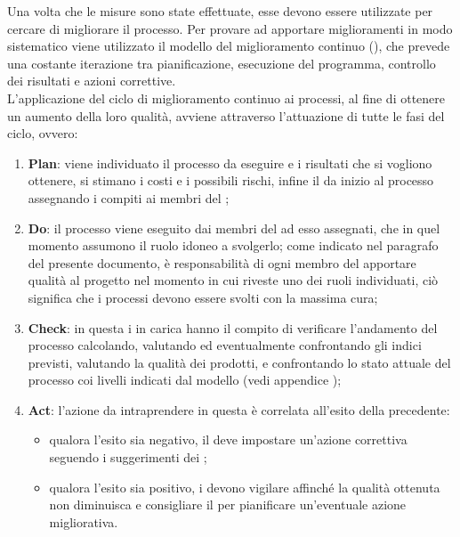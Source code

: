 		Una volta che le misure sono state effettuate, esse devono essere utilizzate per cercare di migliorare il processo. Per provare ad apportare miglioramenti in modo sistematico viene utilizzato il modello del miglioramento continuo (), che prevede una costante iterazione tra pianificazione, esecuzione del programma, controllo dei risultati e azioni correttive.\\
		L'applicazione del ciclo di miglioramento continuo ai processi, al fine di ottenere un aumento della loro qualità, avviene attraverso l'attuazione di tutte le fasi del ciclo, ovvero:
		\begin{enumerate}
		\item \textbf{Plan}: viene individuato il processo da eseguire e i risultati che si vogliono ottenere, si stimano i costi e i possibili rischi, infine il  da inizio al processo assegnando i compiti ai membri del ;
		\item \textbf{Do}: il processo viene eseguito dai membri del  ad esso assegnati, che in quel momento assumono il ruolo idoneo a svolgerlo; come indicato nel paragrafo  del presente documento, è responsabilità di ogni membro del \groupname{} apportare qualità al progetto nel momento in cui riveste uno dei ruoli individuati, ciò significa che i processi devono essere svolti con la massima cura;
		\item \textbf{Check}: in questa  i  in carica hanno il compito di verificare l'andamento del processo calcolando, valutando ed eventualmente confrontando gli indici previsti, valutando la qualità dei prodotti, e confrontando lo stato attuale del processo coi livelli indicati dal modello  (vedi appendice );
		\item \textbf{Act}: l'azione da intraprendere in questa  è correlata all'esito della  precedente:
		\begin{itemize}
		\item qualora l'esito sia negativo, il  deve impostare un'azione correttiva seguendo i suggerimenti dei ;
		\item qualora l'esito sia positivo, i  devono vigilare affinché la qualità ottenuta non diminuisca e consigliare il  per pianificare un'eventuale azione migliorativa.
		\end{itemize}
		\end{enumerate}
